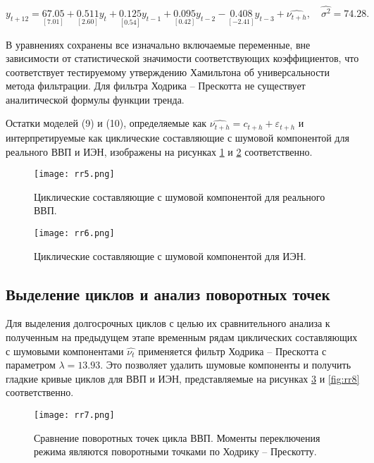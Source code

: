 \documentclass[a4paper,14pt]{extreport}
\begin{document}
	\begin{equation}
		y_{t+12} = \underset{[7.01]}{67.05} 
		+ \underset{[2.60]}{0.511} y_{t}
		+ \underset{[0.54]}{0.125} y_{t-1}
		+ \underset{[0.42]}{0.095} y_{t-2}
		- \underset{[-2.41]}{0.408} y_{t-3}
		+ \hat{\nu_{t+h}}, \quad \hat{\sigma^2}=74.28 .
		\label{eq:ham_fitted2}
	\end{equation}
	
	В уравнениях сохранены все изначально включаемые переменные, вне зависимости от статистической значимости соответствующих коэффициентов, что соответствует тестируемому утверждению Хамильтона об универсальности метода фильтрации. Для фильтра Ходрика – Прескотта не существует аналитической формулы функции тренда.

	Остатки моделей (9) и (10), определяемые как $\hat{\nu_{t+h}} = c_{t+h} + \varepsilon_{t+h}$ и интерпретируемые как циклические составляющие с шумовой компонентой для реального ВВП и ИЭН, изображены на рисунках \ref{fig:rr5} и \ref{fig:rr6} соответственно.
	
	\begin{figure}
		\label{fig:rr5}
		\texttt{[image: rr5.png]}
		\caption{
			Циклические составляющие с шумовой компонентой для реального ВВП.
		}
	\end{figure}	
	
	\begin{figure}
		\label{fig:rr6}
		\texttt{[image: rr6.png]}
		\caption{
			Циклические составляющие с шумовой компонентой для ИЭН.
		}
	\end{figure}	

	\subsection{Выделение циклов и анализ поворотных точек}
	
	Для выделения долгосрочных циклов с целью их сравнительного анализа к полученным на предыдущем этапе временным рядам  циклических составляющих с шумовыми компонентами $\hat{\nu_t}$ применяется фильтр Ходрика – Прескотта с параметром  $\lambda=13.93$. Это позволяет удалить шумовые компоненты и получить гладкие кривые циклов для ВВП и ИЭН, представляемые на рисунках \ref{fig:rr7} и \ref{fig:rr8} соответственно. 
	
	
	\begin{figure}
		\label{fig:rr7}
		\texttt{[image: rr7.png]}
		\caption{
			Сравнение поворотных точек цикла ВВП. Моменты переключения режима являются поворотными точками по Ходрику – Прескотту. 
		}
	\end{figure}	
	
\end{document}
